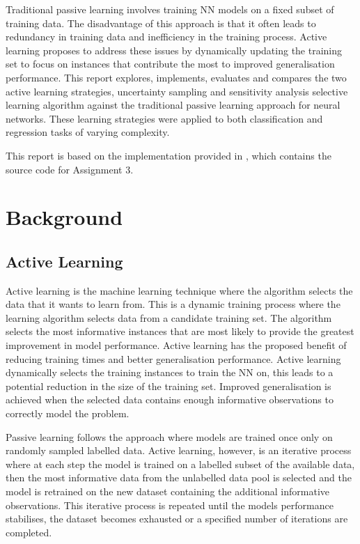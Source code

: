 \documentclass[conference]{IEEEtran}
\begin{document}
	Traditional passive learning involves training NN models on a fixed subset of training data. The disadvantage of this approach is that it often leads to redundancy in training data and inefficiency in the training process. Active learning proposes to address these issues by dynamically updating the training set to focus on instances that contribute the most to improved generalisation performance. This report explores, implements, evaluates and compares the two active learning strategies, uncertainty sampling and sensitivity analysis selective learning algorithm against the traditional passive learning approach for neural networks. These learning strategies were applied to both classification and regression tasks of varying complexity.

	This report is based on the implementation provided in \cite{github}, which contains the source code for Assignment 3.

	\section{Background}\label{B}
	\subsection{Active Learning}
	Active learning is the machine learning technique where the algorithm selects the data that it wants to learn from. This is a dynamic training process where the learning algorithm selects data from a candidate training set. The algorithm selects the most informative instances that are most likely to provide the greatest improvement in model performance. Active learning has the proposed benefit of reducing training times and better generalisation performance. Active learning dynamically selects the training instances to train the NN on, this leads to a potential reduction in the size of the training set. Improved generalisation is achieved when the selected data contains enough informative observations to correctly model the problem.
	
	Passive learning follows the approach where models are trained once only on randomly sampled labelled data. Active learning, however, is an iterative process where at each step the model is trained on a labelled subset of the available data, then the most informative data from the unlabelled data pool is selected and the model is retrained on the new dataset containing the additional informative observations. This iterative process is repeated until the models performance stabilises, the dataset becomes exhausted or a specified number of iterations are completed.
	
\end{document}

